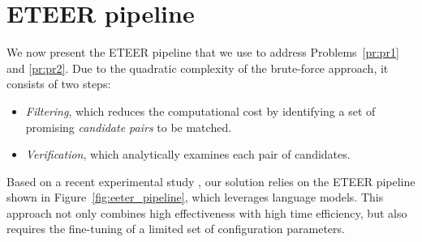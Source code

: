 \section{ETEER pipeline}\label{sec:eteer_pipeline}

We now present the ETEER pipeline that we use to address
Problems~\ref{pr:pr1} and \ref{pr:pr2}. 
Due to the quadratic complexity of the brute-force approach, it consists of two steps:
\begin{itemize}[leftmargin=*]
    \item \emph{Filtering}, which reduces the computational cost by identifying a set of promising \emph{candidate pairs} to be matched.
    \item \emph{Verification}, which analytically examines each pair of candidates.
\end{itemize}

Based on a recent experimental study \cite{DBLP:journals/pvldb/ZeakisPSK23}, our solution relies on the ETEER pipeline shown in Figure~\ref{fig:eeter_pipeline}, which leverages language models. This approach not only combines high effectiveness with high time efficiency, but also requires the fine-tuning of a limited set of configuration parameters.




